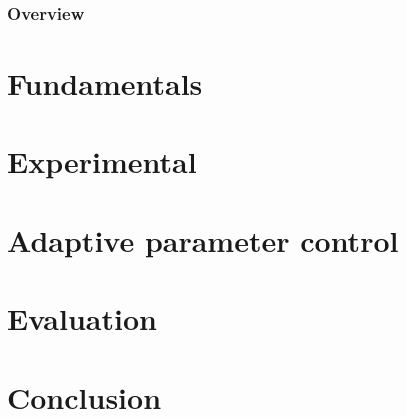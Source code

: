 {
	\begin{frame}
		\frametitle{Overview}
		\tableofcontents
	\end{frame}
}



\section{Fundamentals}



\section{Experimental}



\section{Adaptive parameter control}



\section{Evaluation}



\section{Conclusion}

